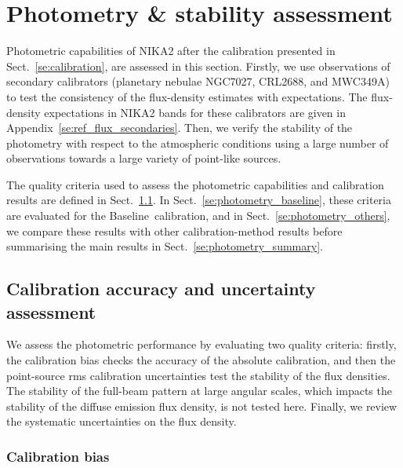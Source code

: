 \documentclass[traditionalabstract]{aa}
\newcommand{\baseline}{Baseline}%
\newcommand{\lp}[1]{#1}
\newcommand{\rev}[1]{#1}
\begin{document}
{%
\section{Photometry \& stability assessment}
\label{se:photometry}
%

Photometric capabilities of NIKA2 after the calibration presented in
Sect.~\ref{se:calibration}, are assessed in this section. Firstly,
we use observations of secondary calibrators (planetary nebulae NGC7027, CRL2688, and
MWC349A) to test the consistency of the flux-density estimates with
expectations. The flux-density expectations
in NIKA2 bands for these calibrators are given in
Appendix~\ref{se:ref_flux_secondaries}. Then,
we verify the stability of the photometry with
respect to the atmospheric conditions using a large number of
observations towards a large variety of {\rev point-like}
sources. 

The quality criteria used to assess the photometric capabilities and
calibration results are defined in Sect.~\ref{se:photometry_criteria}.
In Sect.~\ref{se:photometry_baseline}, these criteria are evaluated
for the \baseline\ calibration, and in Sect.~\ref{se:photometry_others},
we compare these results with other calibration-method results before
summarising the main results in Sect.~\ref{se:photometry_summary}. 


\subsection{Calibration accuracy and uncertainty assessment}
\label{se:photometry_criteria}

We assess the photometric performance by evaluating two
quality criteria: firstly, the calibration bias checks the accuracy of
the absolute calibration, and then the {\rev point-source} rms
calibration uncertainties test the stability of the flux
densities. {\rev The stability of the full-beam pattern at large
angular scales, which impacts the stability of the diffuse emission
flux density, is not tested here}. {\lp Finally, we review the
systematic uncertainties on the flux density.}


\subsubsection{Calibration bias}
\label{se:def_calibration_bias}

}
\end{document}
